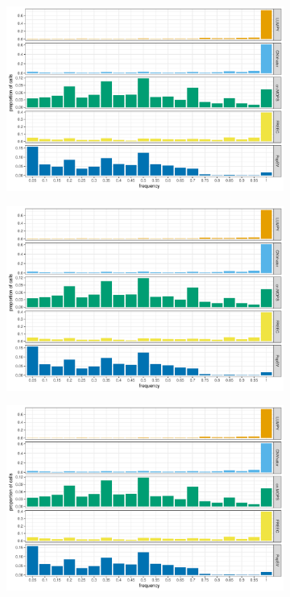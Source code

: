 \begin{figure}[htp]
  \centering
  \begin{subfigure}{.48\textwidth}
    \includegraphics[width=\linewidth, page=3]{figures/cagekid-benchmark.pdf}
    \caption{}
  \end{subfigure}
  \begin{subfigure}{.48\textwidth}
    \includegraphics[width=\linewidth, page=2]{figures/cagekid-benchmark.pdf}
    \caption{}
  \end{subfigure}
  \begin{subfigure}{.48\textwidth}
    \includegraphics[width=\linewidth, page=4]{figures/cagekid-benchmark.pdf}

\end{subfigure}
\end{figure}
